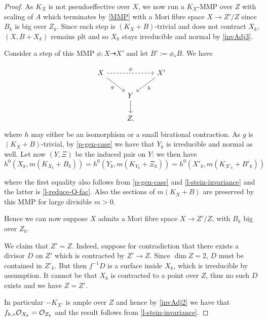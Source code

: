 	\begin{proof}
		
		As $K_X$ is not pseudoeffective over $X$, we now run a $K_{X}$-MMP over $Z$ with scaling of $A$ which terminates by \autoref{MMP} with a Mori fibre space $X \to Z'/Z$ since $B_k$ is big over $Z_k$. 
		Since each step is $(K_{X}+B)$-trivial and does not contract $X_{k}$, $(X,B+X_{k})$ remains plt and so $X_{k}$ stays irreducible and normal by \autoref{invAdj3}.
		
		Consider a step of this MMP $\phi \colon X \dashrightarrow X'$ and let $B':=\phi_*B$.  We have
		
		\[\begin{tikzcd}
			X \arrow[swap, rd, "g"] \arrow[rr, "\phi", dashed] &                 & X' \arrow[ld, "h"] \\
			& Y \arrow[d] &                        \\
			& Z ,         &                       
		\end{tikzcd}\]
		where $h$ may either be an isomorphism or a small birational contraction. As $g$ is $(K_X+B)$-trivial, by \autoref{p-gen-case} we have that $Y_k$ is irreducible and normal as well. Let now $(Y,\Xi)$ be the induced pair on $Y$: we then have
		$$h^{0}(X_{k},m(K_{X_k}+B_{k}))=h^{0}(Y_{k},m(K_{Y_{k}}+\Xi_k))=h^{0}(X'_{k},m(K_{X'_k}+B'_{k}))$$ 
		
		where the first equality also follows from \autoref{p-gen-case} and \autoref{l-stein-invariance} and the latter is \autoref{l-reduce-Q-fac}. Also the sections of $m(K_{X}+B)$ are preserved by this MMP for large divisible $m > 0$.
		
		Hence we can now suppose $X$ admits a Mori fibre space $X \to Z'/Z$, with $B_{k}$ big over $Z_{k}$.
		
		We claim that $Z'=Z$.
		Indeed, suppose for contradiction that there exists a divisor $D$ on $Z'$ which is contracted by $Z' \to Z$. Since $\dim Z=2$, $D$ must be contained in $Z'_k$. But then $f^{-1}D$ is a surface inside $X_{k}$, which is irreducible by assumption. It cannot be that $X_{k}$ is contracted to a point over $Z$, thus no such $D$ exists and we have $Z=Z'$.
		
		In particular $-K_{X'}$ is ample over $Z$ and hence by \autoref{invAdj2} we have that $f_{k,*} \ox[X_{k}]=\ox[Z_{k}]$ and the result follows from \autoref{l-stein-invariance}.
	\end{proof}
	
